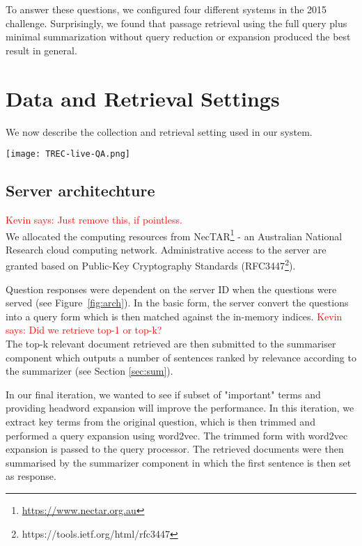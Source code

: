 \documentclass[a4paper,10pt,conference,compsocconf,final]{IEEEtran}
\newcommand{\ko}[1]{\textrm{\textcolor{red}{Kevin says: #1\\}}}
\begin{document}
\bigskip

To answer these questions, we configured four different systems 
in the 2015 challenge.
Surprisingly, we found that passage retrieval using the full query
plus minimal summarization without query reduction or expansion
produced the best result in general.

\section{Data and Retrieval Settings}
We now describe the collection and retrieval setting used in our
system. 

\begin{figure*}
  \centering
  \texttt{[image: TREC-live-QA.png]}
\label{fig:arch}
   \caption{System architechture for each RMIT system. Green shading indicates components that are different when compared to RMIT-0.
}
\end{figure*}

\subsection{Server architechture}
\ko{Just remove this, if pointless.}
We allocated the computing resources from NecTAR\footnote{\url{https://www.nectar.org.au}} - an Australian National Research cloud computing network. Administrative access to the server are granted based on Public-Key Cryptography Standards (RFC3447\footnote{https://tools.ietf.org/html/rfc3447}). 

Question responses were dependent on the server ID when the questions were served (see Figure~\ref{fig:arch}). In the basic form, the server convert the questions into a query form which is then matched against the in-memory indices. 
\ko{Did we retrieve top-1 or top-k?}
The top-k relevant document retrieved are then submitted to the summariser component which outputs a number of sentences ranked by relevance according to the summarizer (see Section \ref{sec:sum}). 

In our final iteration, we wanted to see if subset of "important" terms and providing headword expansion will improve the performance. In this iteration, we extract key terms from the original question, which is then trimmed and performed a query expansion using word2vec. The trimmed form with word2vec expansion is passed to the query processor. The retrieved documents were then summarised by the summarizer component in which the first sentence is then set as response.
\end{document}
